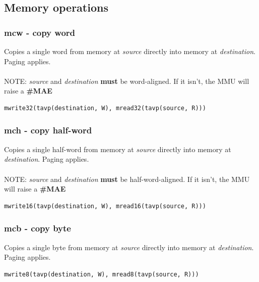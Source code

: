 \documentclass[a4paper,10pt]{article}
\begin{document}
\subsection{Memory operations}
\subsubsection{mcw - copy word}
	{Copies a single word from memory at \emph{source} directly into memory at \emph{destination}. Paging applies.
	\\\\
	NOTE: \emph{source} and \emph{destination} \textbf{must} be word-aligned. If it isn't, the MMU will raise a \textbf{\#MAE}}
\begin{lstlisting}
mwrite32(tavp(destination, W), mread32(tavp(source, R)))
\end{lstlisting}

\subsubsection{mch - copy half-word}
	{Copies a single half-word from memory at \emph{source} directly into memory at \emph{destination}. Paging applies.
	\\\\
	NOTE: \emph{source} and \emph{destination} \textbf{must} be half-word-aligned. If it isn't, the MMU will raise a \textbf{\#MAE}}
\begin{lstlisting}
mwrite16(tavp(destination, W), mread16(tavp(source, R)))
\end{lstlisting}

\subsubsection{mcb - copy byte}
	{Copies a single byte from memory at \emph{source} directly into memory at \emph{destination}. Paging applies.}
\begin{lstlisting}
mwrite8(tavp(destination, W), mread8(tavp(source, R)))
\end{lstlisting}
\end{document}
